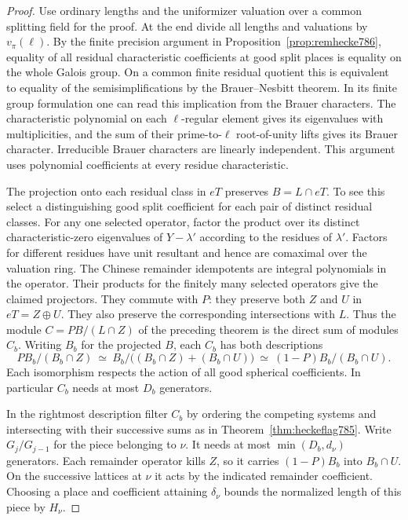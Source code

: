 \documentclass[a4paper,11pt]{article}
\theoremstyle{definition}
\theoremstyle{remark}
\numberwithin{equation}{section}
\begin{document}
\begin{proof}
Use ordinary lengths and the uniformizer valuation
over a common splitting field for the proof. At the
end divide all lengths and valuations by \(v_\pi(\ell)\).
By the finite precision argument in
Proposition~\ref{prop:remhecke786}, equality of all
residual characteristic coefficients at good split
places is equality on the whole Galois group.
On a common finite residual quotient this is equivalent
to equality of the semisimplifications by the
Brauer--Nesbitt theorem. In its finite group formulation
one can read this implication from the Brauer characters.
The characteristic polynomial on each \(\ell\)-regular
element gives its eigenvalues with multiplicities, and
the sum of their prime-to-\(\ell\) root-of-unity lifts
gives its Brauer character. Irreducible Brauer characters
are linearly independent. This argument uses polynomial
coefficients at every residue characteristic.

The projection onto each residual class in \(eT\)
preserves \(B=L\cap eT\). To see this select a
distinguishing good split coefficient for each pair
of distinct residual classes. For any one selected
operator, factor the product over its distinct
characteristic-zero eigenvalues of \(Y-\lambda'\)
according to the residues of \(\lambda'\). Factors for
different residues have unit resultant and hence are
comaximal over the valuation ring. The Chinese remainder
idempotents are integral polynomials in the operator.
Their products for the finitely many selected operators
give the claimed projectors. They commute with \(P\):
they preserve both \(Z\) and \(U\) in \(eT=Z\oplus U\).
They also preserve the corresponding intersections with
\(L\). Thus the module \(C=PB/(L\cap Z)\) of the
preceding theorem is the direct sum of modules \(C_b\).
Writing \(B_b\) for the projected \(B\), each \(C_b\)
has both descriptions
\[
  PB_b/(B_b\cap Z)\ \simeq\ B_b/\big((B_b\cap Z)+(B_b\cap U)\big)
             \ \simeq\ (1-P)B_b/(B_b\cap U).
\]
Each isomorphism respects the action of all good
spherical coefficients. In particular \(C_b\) needs at
most \(D_b\) generators.

In the rightmost description filter \(C_b\) by ordering
the competing systems and intersecting with their
successive sums as in Theorem~\ref{thm:heckeflag785}.
Write \(G_j/G_{j-1}\) for the piece belonging to \(\nu\).
It needs at most \(\min(D_b,d_\nu)\) generators.
Each remainder operator kills \(Z\), so it carries
\((1-P)B_b\) into \(B_b\cap U\). On the successive
lattices at \(\nu\) it acts by the indicated remainder
coefficient. Choosing a place and coefficient attaining
\(\delta_\nu\) bounds the normalized length of this
piece by \(H_\nu\).


\end{proof}
\end{document}

